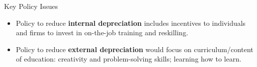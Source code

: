 \documentclass{beamer}
\begin{document}
\begin{frame}{Key Policy Issues}
	\fontsize{12}{17}\selectfont
	\begin{itemize}
		\item Policy to reduce \textbf{internal depreciation} includes incentives to individuals and firms to invest in on-the-job training and reskilling. 
		\vspace{1cm}
		
		\item Policy to reduce \textbf{external depreciation} would focus on curriculum/content of education: creativity and problem-solving skills; learning how to learn.
	\end{itemize}
\end{frame}
\end{document}
